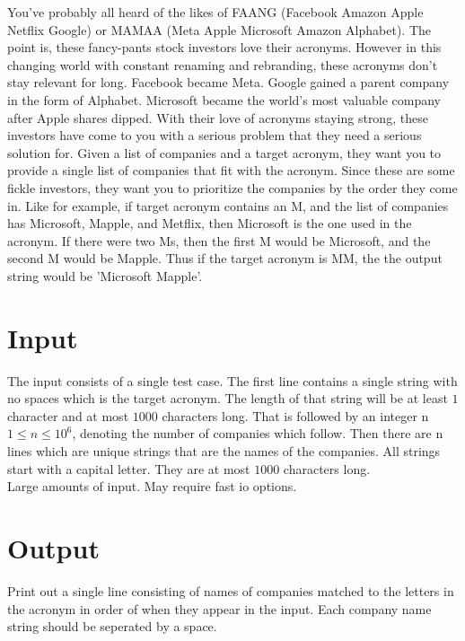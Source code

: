 
You've probably all heard of the likes of FAANG (Facebook Amazon Apple Netflix Google) or MAMAA (Meta Apple Microsoft Amazon Alphabet). The point is, these fancy-pants stock investors love their acronyms. However in this changing world with constant renaming and rebranding, these acronyms don't stay relevant for long. Facebook became Meta. Google gained a parent company in the form of Alphabet. Microsoft became the world's most valuable company after Apple shares dipped. With their love of acronyms staying strong, these investors have come to you with a serious problem that they need a serious solution for. Given a list of companies and a target acronym, they want you to provide a single list of companies that fit with the acronym. Since these are some fickle investors, they want you to prioritize the companies by the order they come in. Like for example, if target acronym contains an M, and the list of companies has Microsoft, Mapple, and Metflix, then Microsoft is the one used in the acronym. If there were two Ms, then the first M would be Microsoft, and the second M would be Mapple. Thus if the target acronym is MM, the the output string would be 'Microsoft Mapple'.

\section*{Input}

The input consists of a single test case. The first line contains a single string with no spaces which is the target acronym. The length of that string will be at least $1$ character and at most $1000$ characters long. That is followed by an integer n $1 \le n \le 10^{6}$, denoting the number of companies which follow. Then there are n lines which are unique strings that are the names of the companies. All strings start with a capital letter. They are at most $1000$ characters long.
\\
Large amounts of input. May require fast io options.

\section*{Output}

Print out a single line consisting of names of companies matched to the letters in the acronym in order of when they appear in the input. Each company name string should be seperated by a space.
